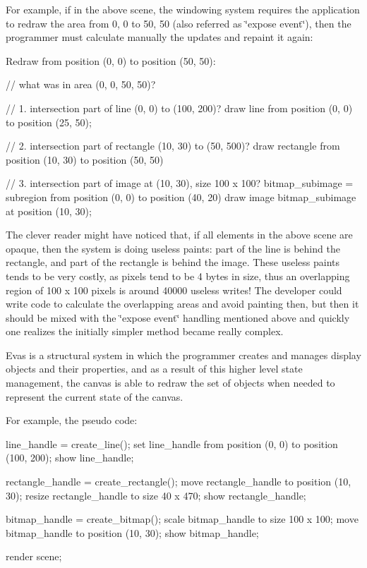 For example, if in the above scene, the windowing system requires the application to redraw the area from 0, 0 to 50, 50 (also referred as \char`\"{}expose event\char`\"{}), then the programmer must calculate manually the updates and repaint it again:

\begin{DoxyVerb}
Redraw from position (0, 0) to position (50, 50):

// what was in area (0, 0, 50, 50)?

// 1. intersection part of line (0, 0) to (100, 200)?
      draw line from position (0, 0) to position (25, 50);

// 2. intersection part of rectangle (10, 30) to (50, 500)?
      draw rectangle from position (10, 30) to position (50, 50)

// 3. intersection part of image at (10, 30), size 100 x 100?
      bitmap_subimage = subregion from position (0, 0) to position (40, 20)
      draw image bitmap_subimage at position (10, 30);
\end{DoxyVerb}


The clever reader might have noticed that, if all elements in the above scene are opaque, then the system is doing useless paints: part of the line is behind the rectangle, and part of the rectangle is behind the image. These useless paints tends to be very costly, as pixels tend to be 4 bytes in size, thus an overlapping region of 100 x 100 pixels is around 40000 useless writes! The developer could write code to calculate the overlapping areas and avoid painting then, but then it should be mixed with the \char`\"{}expose event\char`\"{} handling mentioned above and quickly one realizes the initially simpler method became really complex.

Evas is a structural system in which the programmer creates and manages display objects and their properties, and as a result of this higher level state management, the canvas is able to redraw the set of objects when needed to represent the current state of the canvas.

For example, the pseudo code:

\begin{DoxyVerb}
line_handle = create_line();
set line_handle from position (0, 0) to position (100, 200);
show line_handle;

rectangle_handle = create_rectangle();
move rectangle_handle to position (10, 30);
resize rectangle_handle to size 40 x 470;
show rectangle_handle;

bitmap_handle = create_bitmap();
scale bitmap_handle to size 100 x 100;
move bitmap_handle to position (10, 30);
show bitmap_handle;

render scene;
\end{DoxyVerb}


